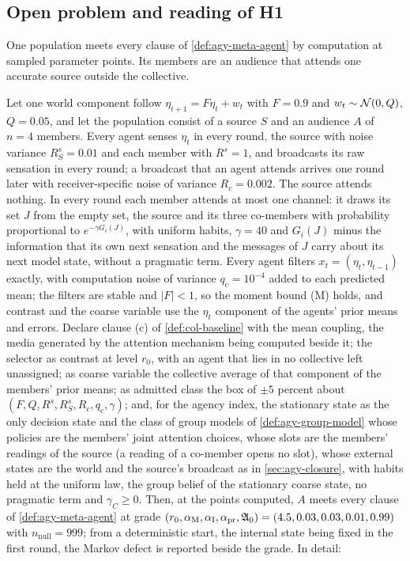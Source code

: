 \subsection{Open problem and reading of H1}\label{sup:agy-open-problem-and-reading-of-h1}

One population meets every clause of \cref{def:agy-meta-agent} by computation at sampled parameter points. Its members are an audience that attends one accurate source outside the collective.

\begin{observation}\label{obs:agy-audience}
Let one world component follow $\eta_{t+1}=F\eta_t+w_t$ with $F=0.9$ and $w_t\sim\mathcal{N}(0,Q)$, $Q=0.05$, and let the population consist of a source $S$ and an audience $A$ of $n=4$ members. Every agent senses $\eta_t$ in every round, the source with noise variance $R^s_S=0.01$ and each member with $R^s=1$, and broadcasts its raw sensation in every round; a broadcast that an agent attends arrives one round later with receiver-specific noise of variance $R_c=0.002$. The source attends nothing. In every round each member attends at most one channel: it draws its set $J$ from the empty set, the source and its three co-members with probability proportional to $e^{-\gamma G_i(J)}$, with uniform habits, $\gamma=40$ and $G_i(J)$ minus the information that its own next sensation and the messages of $J$ carry about its next model state, without a pragmatic term. Every agent filters $x_t=(\eta_t,\eta_{t-1})$ exactly, with computation noise of variance $q_{\mathrm c}=10^{-4}$ added to each predicted mean; the filters are stable and $\lvert F\rvert<1$, so the moment bound (M) holds, and contrast and the coarse variable use the $\eta_t$ component of the agents' prior means and errors. Declare clause (c) of \cref{def:col-baseline} with the mean coupling, the media generated by the attention mechanism being computed beside it; the selector as contrast at level $r_0$, with an agent that lies in no collective left unassigned; as coarse variable the collective average of that component of the members' prior means; as admitted class the box of $\pm5$ percent about $(F,Q,R^s,R^s_S,R_c,q_{\mathrm c},\gamma)$; and, for the agency index, the stationary state as the only decision state and the class of group models of \cref{def:agy-group-model} whose policies are the members' joint attention choices, whose slots are the members' readings of the source (a reading of a co-member opens no slot), whose external states are the world and the source's broadcast as in \cref{sec:agy-closure}, with habits held at the uniform law, the group belief of the stationary coarse state, no pragmatic term and $\gamma_C\ge0$. Then, at the points computed, $A$ meets every clause of \cref{def:agy-meta-agent} at grade $(r_0,\alpha_{\mathrm M},\alpha_{\mathrm I},\alpha_{\mathrm{pr}},\mathfrak{A}_0)=(4.5,0.03,0.03,0.01,0.99)$ with $n_{\mathrm{null}}=999$; from a deterministic start, the internal state being fixed in the first round, the Markov defect is reported beside the grade. In detail:

\end{observation}
